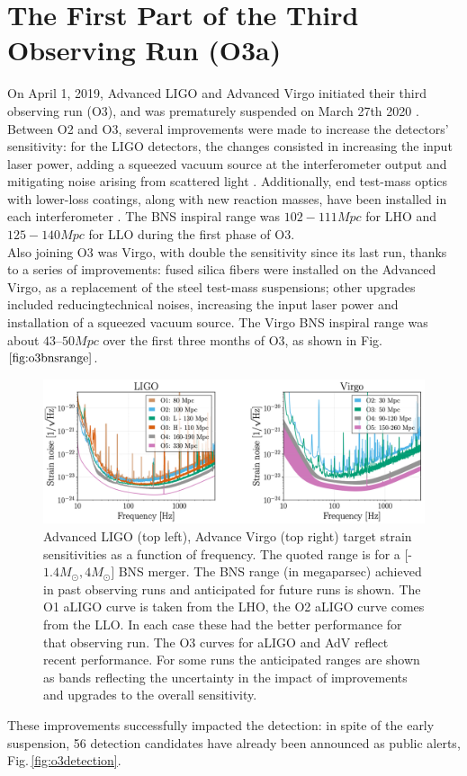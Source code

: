 \documentclass[binding=0.6cm, LaM]{sapthesis}
\begin{document}
\section{The First Part of the Third Observing Run (O3a)}

	On April 1, 2019, Advanced LIGO and Advanced Virgo initiated their third observing run (O3), 
	and was prematurely suspended on March 27th 2020 \cite{53}.
	Between O2 and O3, several improvements were made to increase the detectors’ sensitivity: for the LIGO detectors, 
	the changes consisted in increasing the input laser power, adding a squeezed vacuum source 
	at the interferometer output and mitigating noise arising from scattered light .  
	Additionally, end test-mass optics with lower-loss coatings, along with new reaction masses, 
	have been installed in each interferometer \cite{53}. 
	The BNS inspiral range was $102-111 Mpc$ for LHO and $125-140 Mpc$ for LLO during the first phase of O3. \\
	 Also joining O3 was Virgo, with double the sensitivity since its last run, thanks to a series of improvements: 
	fused silica fibers were installed on the Advanced Virgo, as a replacement of the steel test-mass suspensions;
	other upgrades included reducingtechnical noises, increasing the input laser power 
	and installation of a squeezed vacuum source. 
	The Virgo BNS inspiral range was about $43–50 Mpc$ over the first three months of O3, as shown in Fig.$\ref{fig:o3bnsrange}$. 
                \begin{figure}[H]
                        \label{o3bnsrange}
                        \includegraphics[scale=0.5]{o3bnsrange}
                        \centering
                        \caption{Advanced LIGO (top left), Advance Virgo (top right) target strain sensitivities as a function of frequency. The quoted range is for a [-$1.4M_\odot, 4 M_\odot]$ BNS merger. The BNS range (in megaparsec) achieved in past observing runs and anticipated for future runs is shown. The O1 aLIGO curve is taken from the LHO, the O2 aLIGO curve comes from the LLO. In each case these had the better performance for that observing run. The O3 curves for aLIGO and AdV reflect recent performance. For some runs the anticipated ranges are shown as bands reflecting the uncertainty in the impact of improvements and upgrades to the overall sensitivity. \cite{53}}
                        \label{fig:o3bnsrange}
                \end{figure}
	These improvements successfully impacted the detection: in spite of the early suspension, 
	56 detection candidates have already been announced as public alerts, Fig.\,\ref{fig:o3detection}.
\end{document}
